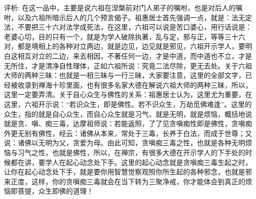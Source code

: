 \documentclass[12pt,twoside,openany]{book}
\newcommand{\kai}[1]{{\CJKfamily{kai}#1}}
\begin{document}
\kai{评析: 在这一品中，主要是说六祖在涅槃前对门人弟子的嘱咐，也是对后人的嘱咐，以及六祖所暗示后人的几个预言偈子。祖惠居士首先强调一点，就是：法无定法，不要把三十六对法学成死法，在这里，六祖可以说是苦口婆心，用行话说是：老婆心切，目的只有一个，就是为学人破除执著，乱与定，邪与正，等等三十六对，都是境相上的各种对立两边，就是边见，边见就是邪见，六祖开示学人，要明白这相互对立的二边，来去相因，不著任何一边，才是中道，而中道也不立，才是无所住，才是清净自性理体，正如六祖所说：究竟二法尽除，更无去处。关于六祖大师的两种三昧：也就是一相三昧与一行三昧，大家要注意，这里的全部文字，已经被收录到禅海十珍里面，也有很多名家大德在解说六祖大师的两种三昧，所以，这里一定要弄清。关于自心众生与佛性的关系：祖惠居士认为，这里尤为重要，在这里，六祖开示说：“若识众生，即是佛性。若不识众生，万劫觅佛难逢”。这里的众生，指的就是自心众生，而自心众生就是习气，就是无明，就是烦恼，概括地说就是贪、嗔、痴三毒，达摩祖师说：若能返照，了了见贪嗔痴性即是佛性，贪嗔痴外更无别有佛性，经云：诸佛从本来，常处于三毒，长养于白法，而成于世尊；又说：诸佛以无明为父，贪爱为母。由此可知，贪嗔痴三毒之性，也就是各种无明烦恼与习气之性，也就是佛性，所以，在禅宗，有很多大德在开示学人的下手处的时候都在讲，要学人在起心动念处下手。这里的起心动念就是贪嗔痴三毒生起之时，让你在起心动念处下手，就是要你用智慧觉察观照你所生起的各种邪念，也就是邪来正度，这样，你的贪嗔痴三毒就会在当下转为三聚净戒，你才能体会到真正的烦恼即菩提，众生即佛的道理！}
\end{document}
